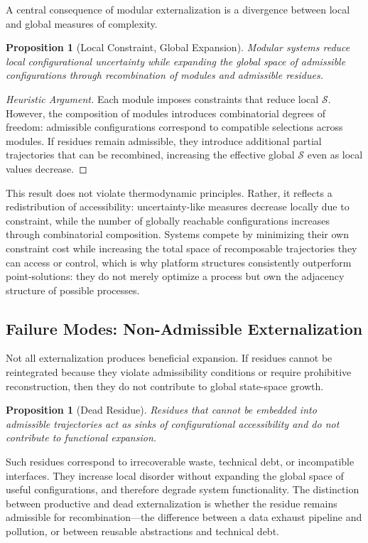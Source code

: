 \documentclass[11pt, a4paper, twocolumn]{article}
\newtheorem{proposition}[definition]{Proposition}
\newcommand{\Sfield}{\mathcal{S}}
\begin{document}
A central consequence of modular externalization is a divergence between local
and global measures of complexity.

\begin{proposition}[Local Constraint, Global Expansion]
Modular systems reduce local configurational uncertainty while expanding the
global space of admissible configurations through recombination of modules
and admissible residues.
\end{proposition}

\begin{proof}[Heuristic Argument]
Each module imposes constraints that reduce local $\Sfield$. However, the
composition of modules introduces combinatorial degrees of freedom: admissible
configurations correspond to compatible selections across modules. If residues
remain admissible, they introduce additional partial trajectories that can be
recombined, increasing the effective global $\Sfield$ even as local values
decrease.
\end{proof}

This result does not violate thermodynamic principles. Rather, it reflects a
redistribution of accessibility: uncertainty-like measures decrease locally due
to constraint, while the number of globally reachable configurations increases
through combinatorial composition. Systems compete by minimizing their own
constraint cost while increasing the total space of recomposable trajectories
they can access or control, which is why platform structures consistently
outperform point-solutions: they do not merely optimize a process but own the
adjacency structure of possible processes.

\subsection{Failure Modes: Non-Admissible Externalization}

Not all externalization produces beneficial expansion. If residues cannot be
reintegrated because they violate admissibility conditions or require
prohibitive reconstruction, then they do not contribute to global state-space
growth.

\begin{proposition}[Dead Residue]
Residues that cannot be embedded into admissible trajectories act as sinks of
configurational accessibility and do not contribute to functional expansion.
\end{proposition}

Such residues correspond to irrecoverable waste, technical debt, or
incompatible interfaces. They increase local disorder without expanding the
global space of useful configurations, and therefore degrade system
functionality. The distinction between productive and dead externalization is
whether the residue remains admissible for recombination---the difference
between a data exhaust pipeline and pollution, or between reusable abstractions
and technical debt.
\end{document}
